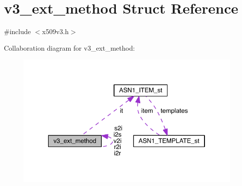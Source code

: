 \hypertarget{structv3__ext__method}{}\section{v3\+\_\+ext\+\_\+method Struct Reference}
\label{structv3__ext__method}


{\ttfamily \#include $<$x509v3.\+h$>$}



Collaboration diagram for v3\+\_\+ext\+\_\+method\+:\nopagebreak
\begin{figure}[H]
\begin{center}
\leavevmode
\includegraphics[width=329pt]{structv3__ext__method__coll__graph}
\end{center}
\end{figure}
